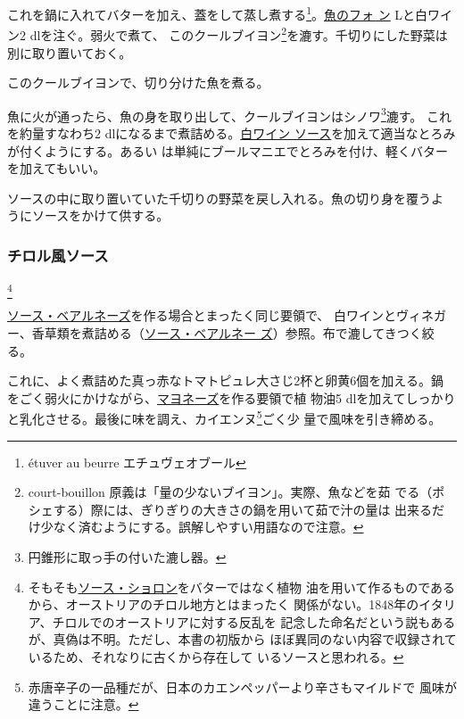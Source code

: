 \begin{recette}
これを鍋に入れてバターを加え、蓋をして蒸し煮する\footnote{étuver au
  beurre エチュヴェオブール}。\protect\hyperlink{fumet-de-poisson}{魚のフォ
ン}\troisquarts{} Lと白ワイン2 dlを注ぐ。弱火で煮て、
このクールブイヨン\footnote{court-bouillon
  原義は「量の少ないブイヨン」。実際、魚などを茹
  でる（ポシェする）際には、ぎりぎりの大きさの鍋を用いて茹で汁の量は
  出来るだけ少なく済むようにする。誤解しやすい用語なので注意。}を漉す。千切りにした野菜は別に取り置いておく。

このクールブイヨンで、切り分けた魚を煮る。

魚に火が通ったら、魚の身を取り出して、クールブイヨンはシノワ\footnote{円錐形に取っ手の付いた漉し器。}漉す。
これを約\unquart{}量すなわち2\undemi{}
dlになるまで煮詰める。\protect\hyperlink{sauce-vin-blanc}{白ワイン
ソース}を加えて適当なとろみが付くようにする。あるい
は単純にブールマニエでとろみを付け、軽くバターを加えてもいい。

ソースの中に取り置いていた千切りの野菜を戻し入れる。魚の切り身を覆うよ
うにソースをかけて供する。

\hypertarget{sauce-tyrolienne}{%
\subsubsection{チロル風ソース}\label{sauce-tyrolienne}}

\footnote{そもそも\protect\hyperlink{sauce-choron}{ソース・ショロン}をバターではなく植物
  油を用いて作るものであるから、オーストリアのチロル地方とはまったく
  関係がない。1848年のイタリア、チロルでのオーストリアに対する反乱を
  記念した命名だという説もあるが、真偽は不明。ただし、本書の初版から
  ほぼ異同のない内容で収録されているため、それなりに古くから存在して
  いるソースと思われる。}


\protect\hyperlink{sauce-bearnaise}{ソース・ベアルネーズ}を作る場合とまったく同じ要領で、
白ワインとヴィネガー、香草類を煮詰める（\protect\hyperlink{sauce-bearnaise}{ソース・ベアルネー
ズ}）参照。布で漉してきつく絞る。

これに、よく煮詰めた真っ赤なトマトピュレ大さじ2杯と卵黄6個を加える。鍋
をごく弱火にかけながら、\protect\hyperlink{mayonnaise}{マヨネーズ}を作る要領で植
物油5
dlを加えてしっかりと乳化させる。最後に味を調え、カイエンヌ\footnote{赤唐辛子の一品種だが、日本のカエンペッパーより辛さもマイルドで
  風味が違うことに注意。}ごく少 量で風味を引き締める。


\end{recette}
